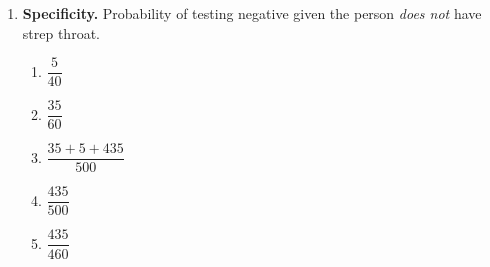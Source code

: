 \begin{enumerate}[label=\textbf{S\arabic*.}]
\item \textbf{Specificity.} Probability of testing negative given the person \emph{does not} have strep throat. 
\begin{enumerate}[label=(\Alph*)]
\item $\dfrac{5}{40}$
\item $\dfrac{35}{60}$
\item $\dfrac{35+5+435}{500}$
\item $\dfrac{435}{500}$
\item $\dfrac{435}{460}$
\end{enumerate}

\end{enumerate}




    









